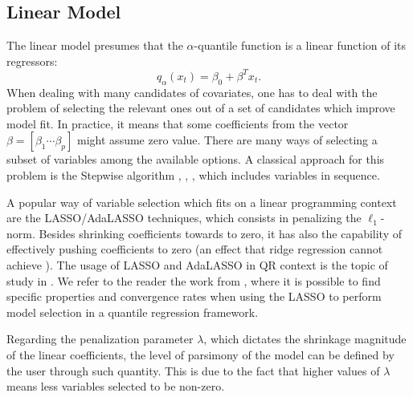 

\subsection{Linear Model}

The linear model presumes that the $\alpha$-quantile function is a linear function of its regressors:
$$q_{\alpha}(x_t) = \beta_{0} + \beta^T x_t.$$   
When dealing with many candidates of covariates, one has to deal with the problem of selecting the relevant ones out of a set of candidates which improve model fit. In practice, it means that some coefficients from the vector $\beta = [ \beta_{1 } \cdots \beta_{p} ]$ might assume zero value.
There are many ways of selecting a subset of variables among the available options.
A classical approach for this problem is the Stepwise algorithm \cite{efroymson1960multiple}, \cite{hocking_selection_1967}, \cite{tibshirani1996regression}, which includes variables in sequence. 

A popular way of variable selection which fits on a linear programming context are the LASSO/AdaLASSO techniques, which consists in penalizing the $\ell_1$-norm. Besides shrinking coefficients towards to zero, it has also the capability of effectively pushing coefficients to zero (an effect that ridge regression cannot achieve \cite{tibshirani1996regression}). The usage of LASSO and AdaLASSO in QR context is the topic of study in \cite{li_l1-norm_2008,ciuperca_adaptive_2016,belloni_l1-penalized_2009,zou_regularized_2008,jiang_interquantile_2014}.
We refer to the reader the work from \cite{belloni_l1-penalized_2009}, where it is possible to find specific properties and convergence rates when using the LASSO to perform model selection in a quantile regression framework. 

Regarding the penalization parameter $\lambda$, which dictates the shrinkage magnitude of the linear coefficients, the level of parsimony of the model can be defined by the user through such quantity. This is due to the fact that higher values of $\lambda$ means less variables selected to be non-zero. 

